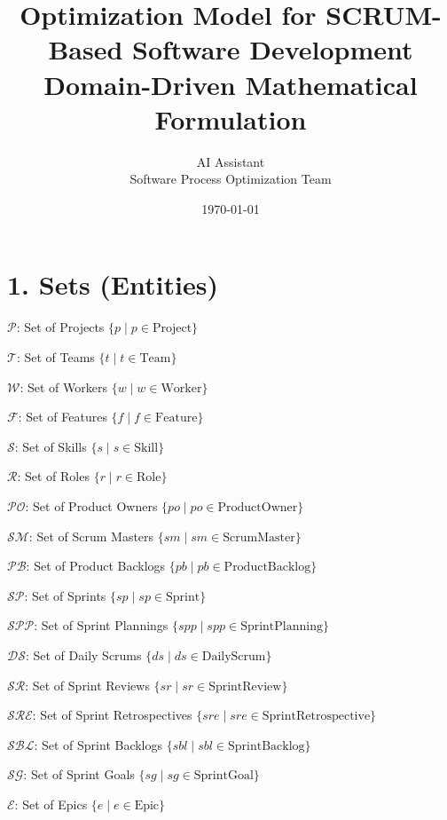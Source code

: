 \documentclass[12pt]{article}
\title{\Huge Optimization Model for SCRUM-Based Software Development \\ \Large Domain-Driven Mathematical Formulation}
\author{\Large AI Assistant \\ Software Process Optimization Team}
\date{\today}
\begin{document}
\maketitle
\tableofcontents
\newpage

\section{1. Sets (Entities)}
\item $ \mathcal{P} $: Set of Projects $ \{ p \mid p \in \text{Project} \} $
    \item $ \mathcal{T} $: Set of Teams $ \{ t \mid t \in \text{Team} \} $
    \item $ \mathcal{W} $: Set of Workers $ \{ w \mid w \in \text{Worker} \} $
    \item $ \mathcal{F} $: Set of Features $ \{ f \mid f \in \text{Feature} \} $
    \item $ \mathcal{S} $: Set of Skills $ \{ s \mid s \in \text{Skill} \} $
    \item $ \mathcal{R} $: Set of Roles $ \{ r \mid r \in \text{Role} \} $
    \item $ \mathcal{PO} $: Set of Product Owners $ \{ po \mid po \in \text{ProductOwner} \} $
    \item $ \mathcal{SM} $: Set of Scrum Masters $ \{ sm \mid sm \in \text{ScrumMaster} \} $
    \item $ \mathcal{PB} $: Set of Product Backlogs $ \{ pb \mid pb \in \text{ProductBacklog} \} $
    \item $ \mathcal{SP} $: Set of Sprints $ \{ sp \mid sp \in \text{Sprint} \} $
    \item $ \mathcal{SPP} $: Set of Sprint Plannings $ \{ spp \mid spp \in \text{SprintPlanning} \} $
    \item $ \mathcal{DS} $: Set of Daily Scrums $ \{ ds \mid ds \in \text{DailyScrum} \} $
    \item $ \mathcal{SR} $: Set of Sprint Reviews $ \{ sr \mid sr \in \text{SprintReview} \} $
    \item $ \mathcal{SRE} $: Set of Sprint Retrospectives $ \{ sre \mid sre \in \text{SprintRetrospective} \} $
    \item $ \mathcal{SBL} $: Set of Sprint Backlogs $ \{ sbl \mid sbl \in \text{SprintBacklog} \} $
    \item $ \mathcal{SG} $: Set of Sprint Goals $ \{ sg \mid sg \in \text{SprintGoal} \} $
    \item $ \mathcal{E} $: Set of Epics $ \{ e \mid e \in \text{Epic} \} $
\end{document}
